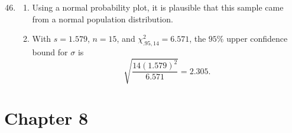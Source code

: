 \documentclass[12pt]{article}
\begin{document}
\begin{enumerate}[label=\textbf{\arabic*.}, leftmargin=*]
\setcounter{enumi}{45}
\item
\begin{enumerate}[label=\alph*.]
    \item Using a normal probability plot, it is plausible that this sample came from a normal population distribution.
    \item With $s=1.579$, $n=15$, and $\chi^2_{.95,14}=6.571$, the $95\%$ upper confidence bound for $\sigma$ is
    \[
    \sqrt{\frac{14(1.579)^2}{6.571}}=2.305.
    \]
\end{enumerate}

\end{enumerate}

\section*{Chapter 8}
\end{document}
